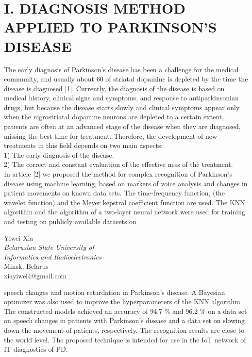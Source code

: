 \documentclass[a4paper,10pt,twocolumn]{article}
\begin{document}
\section*{I. DIAGNOSIS METHOD APPLIED TO
PARKINSON’S DISEASE}
The early diagnosis of Parkinson’s disease has been a
challenge for the medical community, and usually about
60 %
of striatal dopamine is depleted by the time the disease
is diagnosed [1]. Currently, the diagnosis of the disease
is based on medical history, clinical signs and symptoms,
and response to antiparkinsonian drugs, but because the
disease starts slowly and clinical symptoms appear only
when the nigrostriatal dopamine neurons are depleted to
a certain extent, patients are often at an advanced stage
of the disease when they are diagnosed, missing the best
time for treatment. Therefore, the development of new
treatments in this field depends on two main aspects:\\
1) The early diagnosis of the disease.\\
2) The correct and constant evaluation of the effective ness of the treatment.\\ \vspace{0mm}In article [2] we proposed the method for complex recognition of Parkinson’s disease using machine learning, based on markers of voice analysis and changes in patient movements on known data sets. The time-frequency
function, (the wavelet function) and the Meyer kepstral
coefficient function are used. The KNN algorithm and
the algorithm of a two-layer neural network were used
for training and testing on publicly available datasets on
\begin{center}
  Yiwei Xia\\
\textit{Belarusian State University of\\
Informatics and Radioelectronics}\\
Minsk, Belarus\\
xiayiwei4@gmail.com
\end{center}


speech changes and motion retardation in Parkinson’s disease. A Bayesian optimizer was also used to improve the
hyperparameters of the KNN algorithm. The constructed
models achieved an accuracy of 94.7 \% and 96.2 \% on a
data set on speech changes in patients with Parkinson’s
disease and a data set on slowing down the movement of
patients, respectively. The recognition results are close to
the world level. The proposed technique is intended for
use in the IoT network of IT diagnostics of PD.
\end{document}
